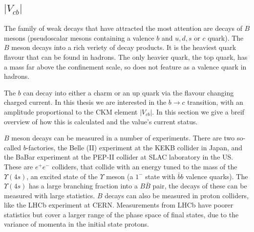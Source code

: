 \subsection{$|V_{cb}|$}

The family of weak decays that have attracted the most attention are decays of $B$ mesons (pseudoscalar mesons containing a valence $b$ and $u,d,s$ or $c$ quark). The $B$ meson decays into a rich veriety of decay products. It is the heaviest quark flavour that can be found in hadrons. The only heavier quark, the top quark, has a mass far above the confinement scale, so does not feature as a valence quark in hadrons.

The $b$ can decay into either a charm or an up quark via the flavour changing charged current. In this thesis we are interested in the $b\to c$ transition, with an amplitude proportional to the CKM element $|V_{cb}|$. In this section we give a breif overview of how this is calculated and the value's current status.

$B$ meson decays can be measured in a number of experiments. There are two so-called $b$-factories, the Belle (II) experiment at the KEKB collider in Japan, and the BaBar experiment at the PEP-II collider at SLAC laboratory in the US. These are $e^+e^-$ colliders, that collide with an energy tuned to the mass of the $\Upsilon(4s)$, an excited state of the $\Upsilon$ meson (a $1^-$ state with $\bar{b}b$ valence quarks). The $\Upsilon(4s)$ has a large branching fraction into a $B\bar{B}$ pair, the decays of these can be measured with large statistics. $B$ decays can also be measured in proton colliders, like the LHCb experiment at CERN. Measurements from LHCb have poorer statistics but cover a larger range of the phase space of final states, due to the variance of momenta in the initial state protons.

